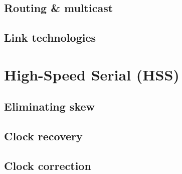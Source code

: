 		
		\subsection{Routing \& multicast}
			
		
		\subsection{Link technologies}
			
	
	\section{High-Speed Serial (HSS)}
		\label{sec:high-speed-serial}
		
		
		\subsection{Eliminating skew}
			
		
		\subsection{Clock recovery}
			
		
		\subsection{Clock correction}
			
